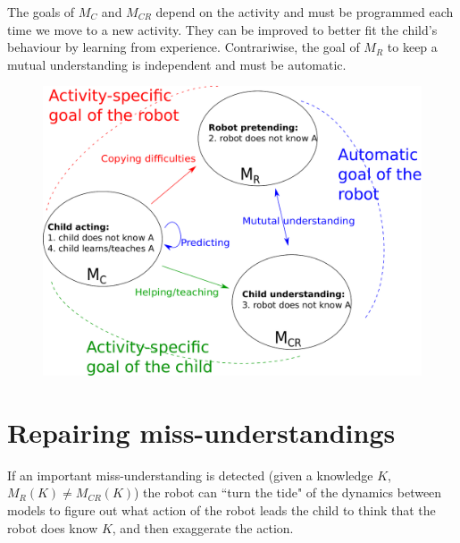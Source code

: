 \documentclass[conference]{IEEEtran}
\begin{document}
The goals of $M_\textit{C}$ and $M_\textit{CR}$ depend on the activity and must be programmed each time we move to a new activity. They can be improved to better fit the child's behaviour by learning from experience. Contrariwise, the goal of $M_\textit{R}$ to keep a mutual understanding is independent and must be automatic. 

\begin{figure}[!]
\centering
\includegraphics[width=1\columnwidth]{mutual_behaviour}
\caption{\small\textbf{}  }
\label{mm}
\end{figure} 

\section{Repairing miss-understandings}
If an important miss-understanding is detected (given a knowledge $K$, $M_\textit{R}(K) \neq M_\textit{CR}(K)$) the robot can ``turn the tide" of the dynamics between models to figure out what action of the robot leads the child to think that the robot does know $K$, and then exaggerate the action.






\end{document}
